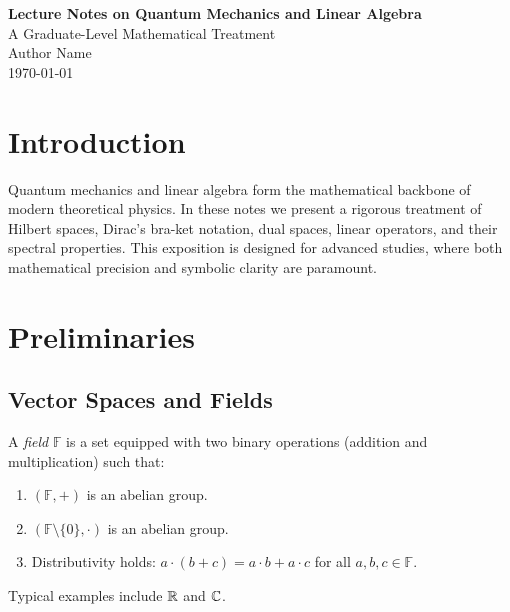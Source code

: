 	
	\begin{titlepage}
		\centering
		\vspace*{2cm}
		{\Huge \bfseries Lecture Notes on Quantum Mechanics and Linear Algebra}\\[1.5cm]
		{\Large A Graduate-Level Mathematical Treatment}\\[2cm]
		{\Large Author Name}\\[1cm]
		{\Large \today}\\[2cm]
		\vfill
	\end{titlepage}
	
	\tableofcontents
	\newpage
	
	\chapter{Introduction}
	
	Quantum mechanics and linear algebra form the mathematical backbone of modern theoretical physics. In these notes we present a rigorous treatment of Hilbert spaces, Dirac's bra-ket notation, dual spaces, linear operators, and their spectral properties. This exposition is designed for advanced studies, where both mathematical precision and symbolic clarity are paramount.
	
	\chapter{Preliminaries}
	
	\section{Vector Spaces and Fields}
	\begin{definition}[Field]
		A \emph{field} \( \mathbb{F} \) is a set equipped with two binary operations (addition and multiplication) such that:
		\begin{enumerate}
			\item \( (\mathbb{F}, +) \) is an abelian group.
			\item \( (\mathbb{F}\setminus\{0\}, \cdot) \) is an abelian group.
			\item Distributivity holds: \( a\cdot(b+c) = a\cdot b + a\cdot c \) for all \( a,b,c\in\mathbb{F} \).
		\end{enumerate}
		Typical examples include \( \mathbb{R} \) and \( \mathbb{C} \).
	\end{definition}
	
